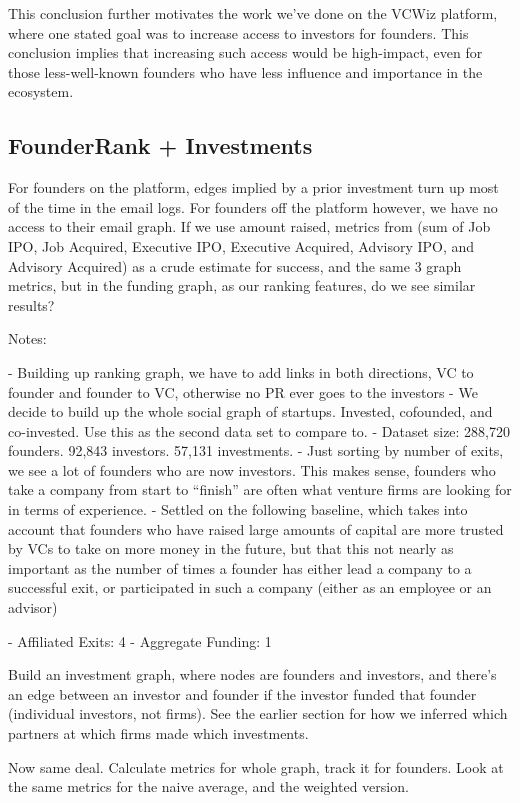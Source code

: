 This conclusion further motivates the work we've done on the VCWiz platform, where one stated goal was to increase access to investors for founders. This conclusion implies that increasing such access would be high-impact, even for those less-well-known founders who have less influence and importance in the ecosystem.

\subsection{FounderRank + Investments}

For founders on the platform, edges implied by a prior investment turn up most of the time in the email logs. For founders off the platform however, we have no access to their email graph. If we use amount raised, metrics from \cite{2017arXiv170604229H} (sum of Job IPO, Job Acquired, Executive IPO, Executive Acquired, Advisory IPO, and Advisory Acquired) as a crude estimate for success, and the same 3 graph metrics, but in the funding graph, as our ranking features, do we see similar results?

Notes:

- Building up ranking graph, we have to add links in both directions, VC to founder and founder to VC, otherwise no PR ever goes to the investors
- We decide to build up the whole social graph of startups. Invested, cofounded, and co-invested. Use this as the second data set to compare to.
- Dataset size: 288,720 founders. 92,843 investors. 57,131 investments.
- Just sorting by number of exits, we see a lot of founders who are now investors. This makes sense, founders who take a company from start to ``finish'' are often what venture firms are looking for in terms of experience.
- Settled on the following baseline, which takes into account that founders who have raised large amounts of capital are more trusted by VCs to take on more money in the future, but that this not nearly as important as the number of times a founder has either lead a company to a successful exit, or participated in such a company (either as an employee or an advisor)

- Affiliated Exits: 4
- Aggregate Funding: 1

Build an investment graph, where nodes are founders and investors, and there's an edge between an investor and founder if the investor funded that founder (individual investors, not firms). See the earlier section for how we inferred which partners at which firms made which investments.

Now same deal. Calculate metrics for whole graph, track it for founders. Look at the same metrics for the naive average, and the weighted version.

